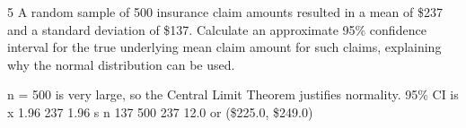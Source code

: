 \documentclass[a4paper,12pt]{article}
\begin{document}


5 A random sample of 500 insurance claim amounts resulted in a mean of \$237 and a standard deviation of \$137.
Calculate an approximate 95\% confidence interval for the true underlying mean claim amount for such claims, explaining why the normal distribution can be used.


n = 500 is very large, so the Central Limit Theorem justifies normality.
95\% CI is x 1.96
237 1.96
s
n
137
500
237 12.0 or (\$225.0, \$249.0)
\end{document}
